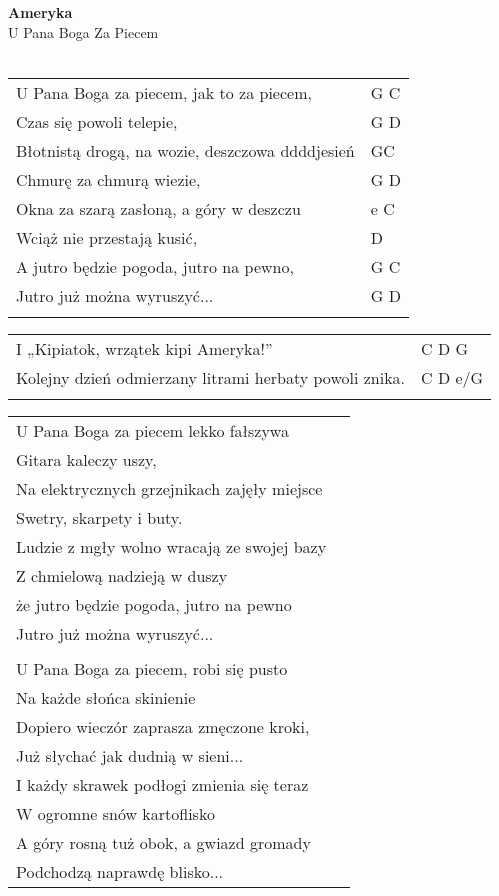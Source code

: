 \documentclass[a5paper]{article}
\begin{document}


\noindent
\fontsize{12pt}{15pt}\selectfont
\textbf{Ameryka} \\
\fontsize{8pt}{10pt}\selectfont
U Pana Boga Za Piecem \\ \\
\fontsize{10pt}{12pt}\selectfont
{}
\begin{tabular}{@{}p{9.5cm}p{3cm}@{}}
\noindent
U Pana Boga za piecem, jak to za piecem, & G C \\
Czas się powoli telepie, & G D \\
Błotnistą drogą, na wozie, deszczowa ddddjesień & GC \\
Chmurę za chmurą wiezie, & G D \\
Okna za szarą zasłoną, a góry w deszczu & e C \\
Wciąż nie przestają kusić, & D \\
A jutro będzie pogoda, jutro na pewno, & G C \\
Jutro już można wyruszyć... & G D \\ \\
\end{tabular}

\noindent
\begin{tabular}{@{}p{8.5cm}p{3cm}@{}}
I „Kipiatok, wrzątek kipi Ameryka!” & C D G \\
Kolejny dzień odmierzany litrami herbaty powoli znika. & C D e/G \\ \\
\end{tabular}

\noindent
\begin{tabular}{@{}p{8.5cm}p{3cm}@{}}
U Pana Boga za piecem lekko fałszywa \\
Gitara kaleczy uszy, \\
Na elektrycznych grzejnikach zajęły miejsce \\
Swetry, skarpety i buty. \\
Ludzie z mgły wolno wracają ze swojej bazy \\
Z chmielową nadzieją w duszy \\
że jutro będzie pogoda, jutro na pewno \\
Jutro już można wyruszyć... \\ \\

U Pana Boga za piecem, robi się pusto \\
Na każde słońca skinienie \\
Dopiero wieczór zaprasza zmęczone kroki, \\
Już słychać jak dudnią w sieni... \\
I każdy skrawek podłogi zmienia się teraz \\
W ogromne snów kartoflisko \\
A góry rosną tuż obok, a gwiazd gromady \\
Podchodzą naprawdę blisko... 
\end{tabular}
\end{document}
